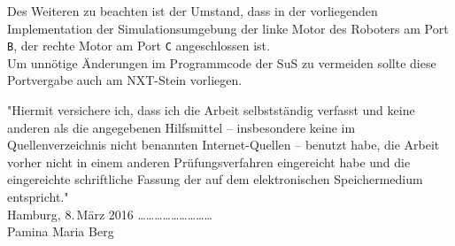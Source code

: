 \documentclass[paper=a4, DIV=calc, BCOR=12mm, twoside=on, onecolumn=on, open = right, titlepage =on, parskip =half-, headsepline = on, footsepline = off, chapterprefix = off, appendixprefix = on, fontsize = 12pt, numbers = noenddot, abstract = on]{scrbook}
\begin{document}

Des Weiteren zu beachten ist der Umstand, dass in der vorliegenden Implementation der Simulationsumgebung der linke Motor des Roboters am Port \texttt{B}, der rechte Motor am Port \texttt{C} angeschlossen ist.\\
Um unnötige Änderungen im Programmcode der SuS zu vermeiden sollte diese Portvergabe auch am NXT-Stein vorliegen.

\cleardoublepage
\newpage
\thispagestyle{empty}
\vspace*{\fill}
"Hiermit versichere ich, dass ich die Arbeit selbstständig verfasst und keine anderen als die angegebenen Hilfsmittel – insbesondere keine im Quellenverzeichnis nicht benannten Internet-Quellen – benutzt habe, die Arbeit vorher nicht in einem anderen Prüfungsverfahren eingereicht habe und die eingereichte schriftliche Fassung der auf dem elektronischen Speichermedium entspricht."\\

Hamburg, 8.\,März 2016 \hspace*{\fill} \dots \dots \dots \dots \dots \dots \dots \dots \dots\\
\hspace*{\fill} Pamina Maria Berg \quad $\,$
\end{document}
